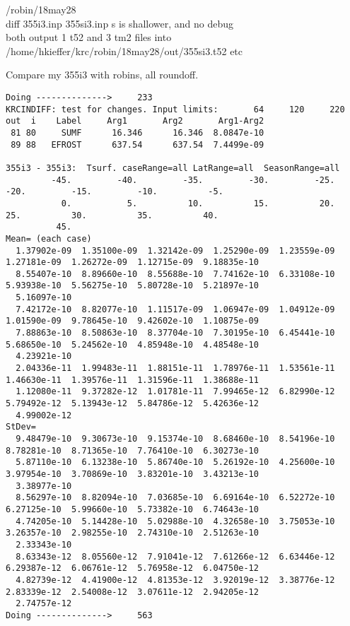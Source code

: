 \documentclass{article}
\begin{document}
/robin/18may28
\\  diff 355i3.inp 355si3.inp   s is shallower, and no debug
\\ both output 1 t52 and 3 tm2 files into /home/hkieffer/krc/robin/18may28/out/355si3.t52 etc

Compare my 355i3 with robins, all roundoff. 
\vspace{-3.mm} 
\begin{verbatim}
Doing -------------->     233
KRCINDIFF: test for changes. Input limits:       64     120     220
out  i    Label     Arg1       Arg2       Arg1-Arg2
 81 80     SUMF      16.346      16.346  8.0847e-10
 89 88   EFROST      637.54      637.54  7.4499e-09

355i3 - 355i3:  Tsurf. caseRange=all LatRange=all  SeasonRange=all
         -45.         -40.         -35.         -30.         -25.         -20.         -15.         -10.          -5.
           0.           5.          10.          15.          20.          25.          30.          35.          40.
          45.
Mean= (each case)
  1.37902e-09  1.35100e-09  1.32142e-09  1.25290e-09  1.23559e-09  1.27181e-09  1.26272e-09  1.12715e-09  9.18835e-10
  8.55407e-10  8.89660e-10  8.55688e-10  7.74162e-10  6.33108e-10  5.93938e-10  5.56275e-10  5.80728e-10  5.21897e-10
  5.16097e-10
  7.42172e-10  8.82077e-10  1.11517e-09  1.06947e-09  1.04912e-09  1.01590e-09  9.78645e-10  9.42602e-10  1.10875e-09
  7.88863e-10  8.50863e-10  8.37704e-10  7.30195e-10  6.45441e-10  5.68650e-10  5.24562e-10  4.85948e-10  4.48548e-10
  4.23921e-10
  2.04336e-11  1.99483e-11  1.88151e-11  1.78976e-11  1.53561e-11  1.46630e-11  1.39576e-11  1.31596e-11  1.38688e-11
  1.12080e-11  9.37282e-12  1.01781e-11  7.99465e-12  6.82990e-12  5.79492e-12  5.13943e-12  5.84786e-12  5.42636e-12
  4.99002e-12
StDev=
  9.48479e-10  9.30673e-10  9.15374e-10  8.68460e-10  8.54196e-10  8.78281e-10  8.71365e-10  7.76410e-10  6.30273e-10
  5.87110e-10  6.13238e-10  5.86740e-10  5.26192e-10  4.25600e-10  3.97954e-10  3.70869e-10  3.83201e-10  3.43213e-10
  3.38977e-10
  8.56297e-10  8.82094e-10  7.03685e-10  6.69164e-10  6.52272e-10  6.27125e-10  5.99660e-10  5.73382e-10  6.74643e-10
  4.74205e-10  5.14428e-10  5.02988e-10  4.32658e-10  3.75053e-10  3.26357e-10  2.98255e-10  2.74310e-10  2.51263e-10
  2.33343e-10
  8.63343e-12  8.05560e-12  7.91041e-12  7.61266e-12  6.63446e-12  6.29387e-12  6.06761e-12  5.76958e-12  6.04750e-12
  4.82739e-12  4.41900e-12  4.81353e-12  3.92019e-12  3.38776e-12  2.83339e-12  2.54008e-12  3.07611e-12  2.94205e-12
  2.74757e-12
Doing -------------->     563

\end{verbatim}
\end{document}
